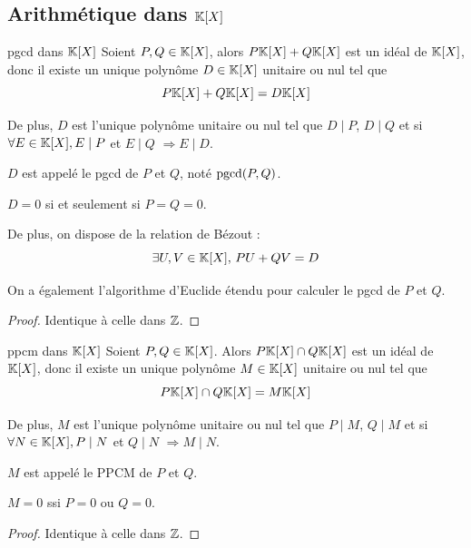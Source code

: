 \subsection{Arithmétique dans \texorpdfstring{$\mathbb{K} [X]$}{K[X]}}

\begin{theoreme}{pgcd dans $\mathbb{K}[X]$}{}
    Soient $P, Q \in \mathbb{K}[X]$, alors $P\mathbb{K}[X] + Q \mathbb{K}[X] $ est un idéal de $\mathbb{K}[X]$, 
    donc il existe un unique polynôme $D \in \mathbb{K}[X]$ unitaire ou nul tel que
    $$P \mathbb{K}[X] + Q \mathbb{K}[X] = D \mathbb{K}[X]$$

    De plus, $D$ est l'unique polynôme unitaire ou nul tel que 
    $D \mid P$, $D \mid Q$ et si $\forall E \in \mathbb{K}[X], E \mid P$ et $E \mid Q$ $\Rightarrow E \mid D$.

    $D$ est appelé le pgcd de $P$ et $Q$, noté $\operatorname{pgcd}(P, Q)$.
\end{theoreme}

\begin{remarque}
    $D = 0$ si et seulement si $P = Q = 0$.

    De plus, on dispose de la relation de Bézout :
    $$\exists U, V \in \mathbb{K}[X], \, PU + QV = D$$

    On a également l'algorithme d'Euclide étendu pour calculer le pgcd de $P$ et $Q$.
\end{remarque}

\begin{proof}
    Identique à celle dans $\mathbb{Z}$. 
\end{proof}

\begin{theoreme}{ppcm dans $\mathbb{K}[X]$}{}
    Soient $P, Q \in \mathbb{K}[X]$. Alors $P\mathbb{K}[X] \cap Q \mathbb{K}[X]$ est un idéal de 
    $\mathbb{K}[X]$, donc il existe un unique polynôme $M \in \mathbb{K}[X]$ unitaire ou nul tel que
    $$P \mathbb{K}[X] \cap Q \mathbb{K}[X] = M \mathbb{K}[X]$$

    De plus, $M$ est l'unique polynôme unitaire ou nul tel que
    $P \mid M$, $Q \mid M$ et si $\forall N \in \mathbb{K}[X], P \mid N$ et $Q \mid N$ $\Rightarrow M \mid N$.

    $M$ est appelé le PPCM de $P$ et $Q$. 
\end{theoreme}

\begin{remarque}
    $M = 0$ ssi $P = 0$ ou $Q = 0$.
\end{remarque}

\begin{proof}
    Identique à celle dans $\mathbb{Z}$.
\end{proof}

